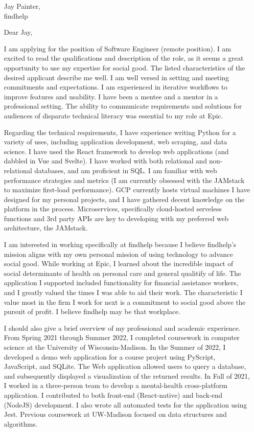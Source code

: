 \documentclass[a4paper, 10pt]{letter}
\begin{document}
	\begin{letter}
	{
	    Jay Painter,\\
		findhelp
	}

		    \opening{Dear Jay,}

			I am applying for the position of Software Engineer (remote position). I am excited to read the qualifications and description of the role, as it seems a great opportunity to use my expertise for social good. The listed characteristics of the desired applicant describe me well. I am well versed in setting and meeting commitments and expectations. I am experienced in iterative workflows to improve features and usability. I have been a mentee and a mentor in a professional setting. The ability to communicate requirements and solutions for audiences of disparate technical literacy was essential to my role at Epic.

			Regarding the technical requirements, I have experience writing Python for a variety of uses, including application development, web scraping, and data science. I have used the React framework to develop web applications (and dabbled in Vue and Svelte). I have worked with both relational and non-relational databases, and am proficient in SQL. I am familiar with web performance strategies and metrics (I am currently obsessed with the JAMstack to maximize first-load performance). GCP currently hosts virtual machines I have designed for my personal projects, and I have gathered decent knowledge on the platform in the process. Microservices, specifically cloud-hosted serveless functions and 3rd party APIs are key to developing with my preferred web architecture, the JAMstack. 

			I am interested in working specifically at findhelp because I believe findhelp's mission aligns with my own personal mission of using technology to advance social good. While working at Epic, I learned about the incredible impact of social determinants of health on personal care and general qualitify of life. The application I supported included functionality for financial assistance workers, and I greatly valued the times I was able to aid their work. The characteristic I value most in the firm I work for next is a commitment to social good above the pursuit of profit. I believe findhelp may be that workplace.    

			I should also give a brief overview of my professional and academic experience. From Spring 2021 through Summer 2022, I completed coursework in computer science at the University of Wisconsin-Madison. In the Summer of 2022, I developed a demo web application for a course project using PyScript, JavaScript, and SQLite. The Web application allowed users to query a database, and subsequently displayed a visualization of the returned results. In Fall of 2021, I worked in a three-person team to develop a mental-health cross-platform application. I contributed to both front-end (React-native) and back-end (NodeJS) development. I also wrote all automated tests for the application using Jest. Previous coursework at UW-Madison focused on data structures and algorithms. 


\end{letter}
\end{document}
